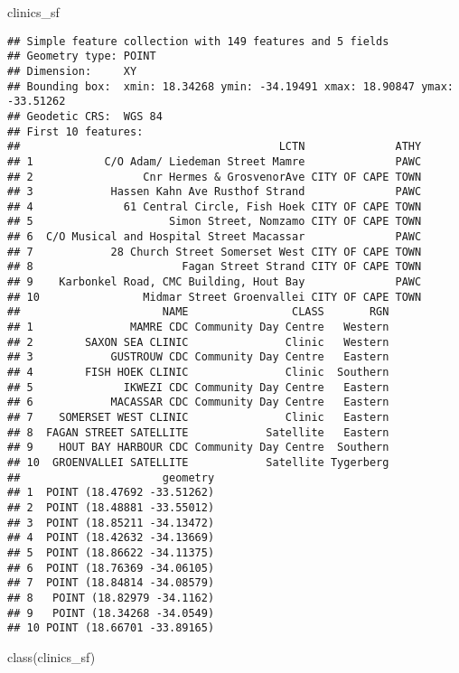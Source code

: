 \documentclass[
]{book}
\newenvironment{Shaded}{\begin{snugshade}}{\end{snugshade}}
\newcommand{\FunctionTok}[1]{\textcolor[rgb]{0.00,0.00,0.00}{#1}}
\newcommand{\NormalTok}[1]{#1}
\begin{document}
\begin{Shaded}
\begin{Highlighting}[]
\NormalTok{clinics\_sf}
\end{Highlighting}
\end{Shaded}

\begin{verbatim}
## Simple feature collection with 149 features and 5 fields
## Geometry type: POINT
## Dimension:     XY
## Bounding box:  xmin: 18.34268 ymin: -34.19491 xmax: 18.90847 ymax: -33.51262
## Geodetic CRS:  WGS 84
## First 10 features:
##                                        LCTN              ATHY
## 1           C/O Adam/ Liedeman Street Mamre              PAWC
## 2                 Cnr Hermes & GrosvenorAve CITY OF CAPE TOWN
## 3            Hassen Kahn Ave Rusthof Strand              PAWC
## 4              61 Central Circle, Fish Hoek CITY OF CAPE TOWN
## 5                     Simon Street, Nomzamo CITY OF CAPE TOWN
## 6  C/O Musical and Hospital Street Macassar              PAWC
## 7            28 Church Street Somerset West CITY OF CAPE TOWN
## 8                       Fagan Street Strand CITY OF CAPE TOWN
## 9    Karbonkel Road, CMC Building, Hout Bay              PAWC
## 10                Midmar Street Groenvallei CITY OF CAPE TOWN
##                      NAME                CLASS       RGN
## 1               MAMRE CDC Community Day Centre   Western
## 2        SAXON SEA CLINIC               Clinic   Western
## 3            GUSTROUW CDC Community Day Centre   Eastern
## 4        FISH HOEK CLINIC               Clinic  Southern
## 5              IKWEZI CDC Community Day Centre   Eastern
## 6            MACASSAR CDC Community Day Centre   Eastern
## 7    SOMERSET WEST CLINIC               Clinic   Eastern
## 8  FAGAN STREET SATELLITE            Satellite   Eastern
## 9    HOUT BAY HARBOUR CDC Community Day Centre  Southern
## 10  GROENVALLEI SATELLITE            Satellite Tygerberg
##                      geometry
## 1  POINT (18.47692 -33.51262)
## 2  POINT (18.48881 -33.55012)
## 3  POINT (18.85211 -34.13472)
## 4  POINT (18.42632 -34.13669)
## 5  POINT (18.86622 -34.11375)
## 6  POINT (18.76369 -34.06105)
## 7  POINT (18.84814 -34.08579)
## 8   POINT (18.82979 -34.1162)
## 9   POINT (18.34268 -34.0549)
## 10 POINT (18.66701 -33.89165)
\end{verbatim}

\begin{Shaded}
\begin{Highlighting}[]
\FunctionTok{class}\NormalTok{(clinics\_sf)}
\end{Highlighting}
\end{Shaded}
\end{document}
